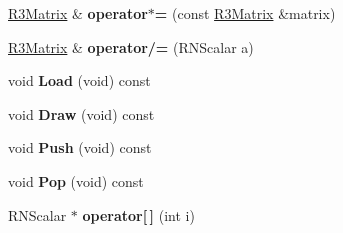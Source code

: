 \begin{DoxyCompactItemize}
\item 
\hyperlink{class_r3_matrix}{R3\+Matrix} \& {\bfseries operator$\ast$=} (const \hyperlink{class_r3_matrix}{R3\+Matrix} \&matrix)\hypertarget{class_r3_matrix_aa064b337c2695b81b37dcf68e4c322bb}{}\label{class_r3_matrix_aa064b337c2695b81b37dcf68e4c322bb}

\item 
\hyperlink{class_r3_matrix}{R3\+Matrix} \& {\bfseries operator/=} (R\+N\+Scalar a)\hypertarget{class_r3_matrix_ac877b7363f710f1e1866d803745c5bc3}{}\label{class_r3_matrix_ac877b7363f710f1e1866d803745c5bc3}

\item 
void {\bfseries Load} (void) const \hypertarget{class_r3_matrix_afbe0e41d7986e4d542268dfccb1c395c}{}\label{class_r3_matrix_afbe0e41d7986e4d542268dfccb1c395c}

\item 
void {\bfseries Draw} (void) const \hypertarget{class_r3_matrix_a74913abd1299e8ddae761ede872a2bcf}{}\label{class_r3_matrix_a74913abd1299e8ddae761ede872a2bcf}

\item 
void {\bfseries Push} (void) const \hypertarget{class_r3_matrix_a357fbedfa27f5c17fb88aae74709fff5}{}\label{class_r3_matrix_a357fbedfa27f5c17fb88aae74709fff5}

\item 
void {\bfseries Pop} (void) const \hypertarget{class_r3_matrix_af9eaeaa5ed759eadfb048e455b9a3843}{}\label{class_r3_matrix_af9eaeaa5ed759eadfb048e455b9a3843}

\item 
R\+N\+Scalar $\ast$ {\bfseries operator\mbox{[}$\,$\mbox{]}} (int i)\hypertarget{class_r3_matrix_acae72956775433e302a862811db68f3a}{}\label{class_r3_matrix_acae72956775433e302a862811db68f3a}

\end{DoxyCompactItemize}
